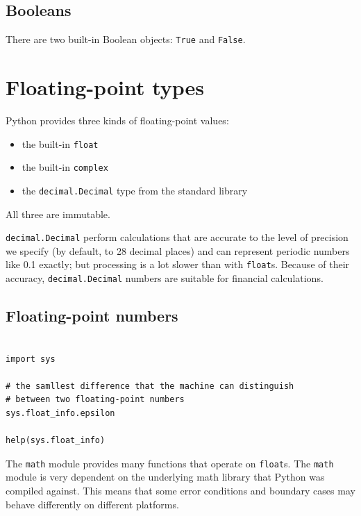 \subsection{Booleans}

There are two built-in Boolean objects: \verb|True| and \verb|False|.

\section{Floating-point types}

Python provides three kinds of floating-point values:
\begin{itemize}
\item the built-in \verb|float|
\item the built-in \verb|complex|
\item the \verb|decimal.Decimal| type from the standard library
\end{itemize}
All three are immutable.


\verb|decimal.Decimal| perform calculations that are accurate to the level of precision we specify (by default, to 28 decimal places) and can represent periodic numbers like 0.1 exactly; but processing is a lot slower than with \verb|float|s.
Because of their accuracy, \verb|decimal.Decimal| numbers are suitable for financial calculations.



\subsection{Floating-point numbers}

\begin{tcolorbox}
  \begin{lstlisting}

import sys

# the samllest difference that the machine can distinguish 
# between two floating-point numbers
sys.float_info.epsilon 

help(sys.float_info)
  \end{lstlisting}
\end{tcolorbox}

The \verb|math| module provides many functions that operate on \verb|float|s.
The \verb|math| module is very dependent on the underlying math library that Python was compiled against.
This means that some error conditions and boundary cases may behave differently on different platforms.


